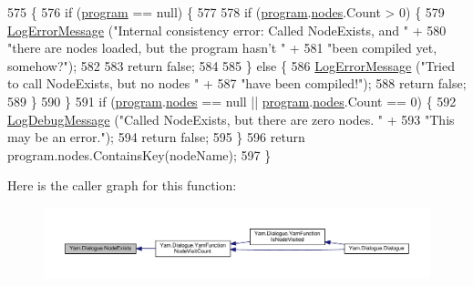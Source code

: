 \begin{DoxyCode}
575                                                 \{
576             \textcolor{keywordflow}{if} (\hyperlink{a00092_a0a1cca92325f430425d784d416cb5c2b}{program} == null) \{
577 
578                 \textcolor{keywordflow}{if} (\hyperlink{a00092_a0a1cca92325f430425d784d416cb5c2b}{program}.\hyperlink{a00152_a3f4928a577c88263ad016be259b175c4}{nodes}.Count > 0) \{
579                     \hyperlink{a00092_a9801e83dd044d6498fdf6ebcc6bec5ac}{LogErrorMessage} (\textcolor{stringliteral}{"Internal consistency error: Called NodeExists, and "} +
580                                      \textcolor{stringliteral}{"there are nodes loaded, but the program hasn't "} +
581                                      \textcolor{stringliteral}{"been compiled yet, somehow?"});
582 
583                     \textcolor{keywordflow}{return} \textcolor{keyword}{false};
584 
585                 \} \textcolor{keywordflow}{else} \{
586                     \hyperlink{a00092_a9801e83dd044d6498fdf6ebcc6bec5ac}{LogErrorMessage} (\textcolor{stringliteral}{"Tried to call NodeExists, but no nodes "} +
587                                      \textcolor{stringliteral}{"have been compiled!"});
588                     \textcolor{keywordflow}{return} \textcolor{keyword}{false};
589                 \}
590             \}
591             \textcolor{keywordflow}{if} (\hyperlink{a00092_a0a1cca92325f430425d784d416cb5c2b}{program}.\hyperlink{a00152_a3f4928a577c88263ad016be259b175c4}{nodes} == null || \hyperlink{a00092_a0a1cca92325f430425d784d416cb5c2b}{program}.\hyperlink{a00152_a3f4928a577c88263ad016be259b175c4}{nodes}.Count == 0) \{
592                 \hyperlink{a00092_a381f48bb0fbb294f8cf44ca57f11be31}{LogDebugMessage} (\textcolor{stringliteral}{"Called NodeExists, but there are zero nodes. "} +
593                                  \textcolor{stringliteral}{"This may be an error."});
594                 \textcolor{keywordflow}{return} \textcolor{keyword}{false};
595             \}
596             \textcolor{keywordflow}{return} program.nodes.ContainsKey(nodeName);
597         \}
\end{DoxyCode}


Here is the caller graph for this function\-:
\nopagebreak
\begin{figure}[H]
\begin{center}
\leavevmode
\includegraphics[width=350pt]{a00092_a93bb76a1f9a4058f225ff4cee97483c6_icgraph}
\end{center}
\end{figure}


